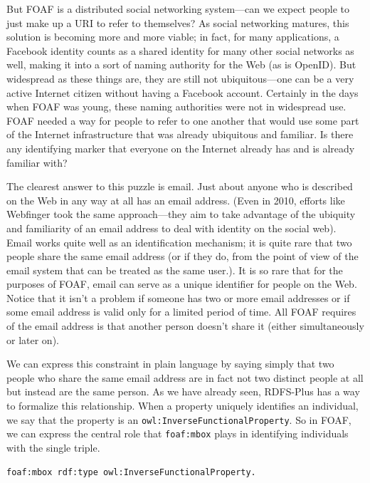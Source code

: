 But FOAF is a distributed social networking system---can we expect
people to just make up a URI to refer to themselves? As social
networking matures, this solution is becoming more and more viable; in
fact, for many applications, a Facebook identity counts as a shared
identity for many other social networks as well, making it into a sort
of naming authority for the Web (as is OpenID). But widespread as these
things are, they are still not ubiquitous---one can be a very active
Internet citizen without having a Facebook account. Certainly in the
days when FOAF was young, these naming authorities were not in
widespread use. FOAF needed a way for people to refer to one another
that would use some part of the Internet infrastructure that was already
ubiquitous and familiar. Is there any identifying marker that everyone
on the Internet already has and is already familiar with?

The clearest answer to this puzzle is email. Just about anyone who is
described on the Web in any way at all has an email address. (Even in
2010, efforts like Webfinger took the same approach---they aim to take
advantage of the ubiquity and familiarity of an email address to deal
with identity on the social web). Email works quite well as an
identification mechanism; it is quite rare that two people share the
same email address (or if they do, from the point of view of the email system that can be treated as the same user.). 
It is so rare that for the purposes of FOAF, email
can serve as a unique identifier for people on the Web. Notice that it
isn't a problem if someone has two or more email addresses or if some
email address is valid only for a limited period of time. All FOAF
requires of the email address is that another person doesn't share it
(either simultaneously or later on).

We can express this constraint in plain language by saying simply that
two people who share the same email address are in fact not two distinct
people at all but instead are the same person. As we have already seen,
RDFS-Plus has a way to formalize this relationship. When a property
uniquely identifies an individual, we say that the property is an
\texttt{owl:InverseFunctionalProperty}. So in FOAF, we can express the central
role that \texttt{foaf:mbox} plays in identifying individuals with the single
triple.

\begin{lstlisting}
foaf:mbox rdf:type owl:InverseFunctionalProperty.
\end{lstlisting}

